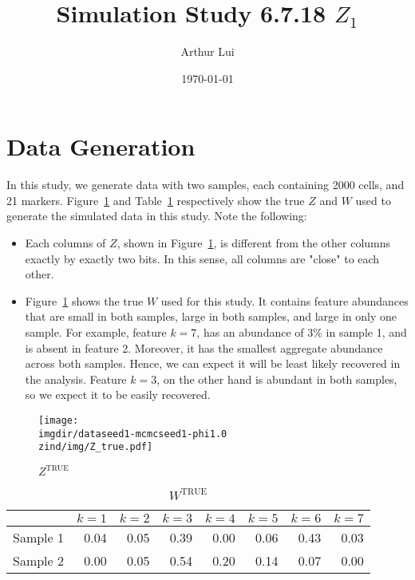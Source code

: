 \documentclass[10pt]{article} %
\title{Simulation Study 6.7.18 $Z_1$}
\author{Arthur Lui}
\date{\today} %
\def\true{\text{TRUE}}
\def\imgdir{../../../results/test-sim-6-7-18}
\def\zind{-Zind1}
\begin{document}
\maketitle



\section{Data Generation}\label{sec:data-generation}
In this study, we generate data with two samples, each containing 2000 cells,
and 21 markers. Figure~\ref{fig:Z-true} and Table~\ref{tab:W-true}
respectively show the true $Z$ and $W$ used to generate the simulated data in
this study. Note the following:
\begin{itemize}
  \item Each columns of $Z$, shown in Figure~\ref{fig:Z-true}, is different
    from the other columns exactly by exactly two bits. In this sense, all
    columns are "close" to each other.
  \item Figure~\ref{tab:W-true} shows the true $W$ used for this study. It
    contains feature abundances that are small in both samples, large in both
    samples, and large in only one sample. For example, feature $k=7$, 
    has an abundance of $3\%$ in sample 1, and is absent in feature 2. 
    Moreover, it has the smallest aggregate abundance across both samples. 
    Hence, we can expect it will be least likely recovered in the analysis. 
    Feature $k=3$, on the other hand is abundant in both samples, so we expect
    it to be easily recovered.
\end{itemize}

\begin{figure}[H]
  \begin{center}  %
    \texttt{[image: \\imgdir/dataseed1-mcmcseed1-phi1.0\\zind/img/Z\_true.pdf]}
  \end{center}
  \caption{$Z^\true$}
  \label{fig:Z-true}
\end{figure}

\begin{table}[ht]
  \centering
  \begin{tabular}{rrrrrrrr}
    \hline
    & $k=1$ & $k=2$ & $k=3$ & $k=4$ & $k=5$ & $k=6$ & $k=7$ \\
    \hline
    Sample 1 & 0.04 & 0.05 & 0.39 & 0.00 & 0.06 & 0.43 & 0.03 \\
    Sample 2 & 0.00 & 0.05 & 0.54 & 0.20 & 0.14 & 0.07 & 0.00 \\
    \hline
  \end{tabular}
  \caption{$W^\true$}
  \label{tab:W-true}
\end{table}
\end{document}
